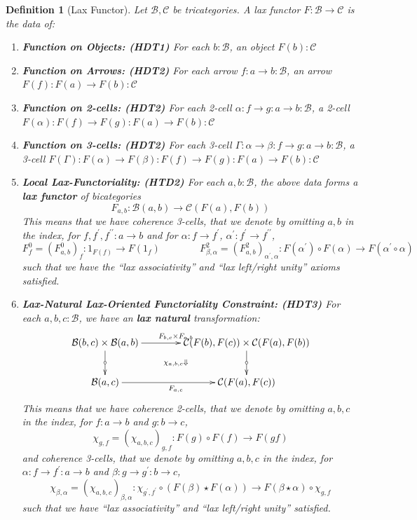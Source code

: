 \documentclass{article}
\numberwithin{equation}{section}
\theoremstyle{definition}
\theoremstyle{plain}
\newtheorem{definition}[equation]{Definition}
\begin{document}
\begin{definition}[Lax Functor] Let $\mathcal{B}, \mathcal{C}$ be tricategories. A lax functor $F: \mathcal{B} \to \mathcal{C}$ is the data of:
	\begin{enumerate}[label = $\bullet$]
		\item \textbf{Function on Objects: (HDT1)} For each $b: \mathcal{B}$, an object $F(b):\mathcal{C}$
		\item \textbf{Function on Arrows: (HDT2)} For each arrow $f: a \to b: \mathcal{B}$, an arrow $F(f): F(a) \to F(b):\mathcal{C}$
		\item \textbf{Function on 2-cells: (HDT2)} For each 2-cell $\alpha: f \to g: a \to b: \mathcal{B}$, a 2-cell $F(\alpha): F(f) \to F(g): F(a) \to F(b):\mathcal{C}$
		\item \textbf{Function on 3-cells: (HDT2)} For each 3-cell $\Gamma: \alpha \to \beta: f \to g: a \to b: \mathcal{B}$, a 3-cell $F(\Gamma): F(\alpha) \to F(\beta): F(f) \to F(g): F(a) \to F(b):\mathcal{C}$
		\item \textbf{Local Lax-Functoriality: (HTD2)} For each $a,b: \mathcal{B}$, the above data forms a \textbf{lax functor} of bicategories
		\[F_{a,b}:\mathcal{B}(a,b) \longrightarrow \mathcal{C}(F(a),F(b))\]
		This means that we have coherence 3-cells, that we denote by omitting $a,b$ in the index, for $f,f^{\prime},f^{\prime\prime}:a \to b$ and for $\alpha:f \to f^{\prime}$, $\alpha^{\prime}:f^{\prime} \to f^{\prime\prime}$,
		\[F^0_f= (F_{a,b}^0)_f: 1_{F(f)} \to F(1_f) \qquad \qquad F^2_{\beta, \alpha} = (F_{a,b}^2)_{\alpha^{\prime}, \alpha}: F(\alpha^{\prime}) \circ F(\alpha) \to F(\alpha^{\prime} \circ \alpha)\]
		such that we have the ``lax associativity'' and ``lax left/right unity'' axioms satisfied.
		\item \textbf{Lax-Natural Lax-Oriented Functoriality Constraint: (HDT3)} For each $a,b,c:\mathcal{B}$, we have an \textbf{lax natural} transformation:
		\[\xymatrix@C=4em{
			\mathcal{B}(b,c) \times \mathcal{B}(a,b) \ar[d]|{\circ} \ar[r]^{F_{b,c} \times F_{a,b}} \ar@{}[dr]|{\chi_{a,b,c}\Downarrow} & \mathcal{C}(F(b),F(c)) \times \mathcal{C}(F(a),F(b)) \ar[d]|{\circ}\\
			\mathcal{B}(a,c) \ar[r]_{F_{a,c}} & \mathcal{C}(F(a),F(c))
		}\]
		This means that we have coherence 2-cells, that we denote by omitting $a,b,c$ in the index, for $f:a \to b$ and $g:b \to c$,
		\[\chi_{g,f} = (\chi_{a,b,c})_{g,f}: F(g) \circ F(f) \to F(gf)\]
		and coherence 3-cells, that we denote by omitting $a,b,c$ in the index, for $\alpha: f \to f^{\prime}:a \to b$ and $\beta: g \to g^{\prime}:b \to c$,
		\[\chi_{\beta,\alpha} = (\chi_{a,b,c})_{\beta,\alpha}: \chi_{g^{\prime}, f^{\prime}}\circ (F(\beta) \star F(\alpha)) \to F(\beta \star \alpha) \circ \chi_{g, f}\]
		such that we have ``lax associativity'' and ``lax left/right unity'' satisfied.
		

\end{enumerate}
\end{definition}
\end{document}
